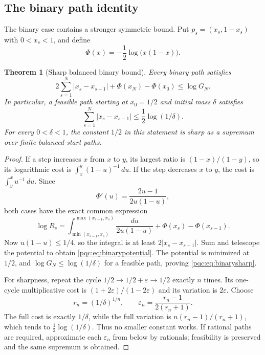 \documentclass[11pt,letterpaper]{article}
\numberwithin{equation}{section}
\newtheorem{theorem}{Theorem}[section]
\theoremstyle{definition}
\theoremstyle{remark}
\begin{document}
\subsection{The binary path identity}
The binary case contains a stronger symmetric bound. Put
$p_s=(x_s,1-x_s)$ with $0<x_s<1$, and define
\begin{equation}\label{pqc:eq:Phi}
 \Phi(x)=-\frac12\log\bigl(x(1-x)\bigr).
\end{equation}

\begin{theorem}[Sharp balanced binary bound]\label{pqc:thm:binary}
Every binary path satisfies
\begin{equation}\label{pqc:eq:binarypotential}
 2\sum_{s=1}^{N}|x_s-x_{s-1}|+
 \Phi(x_N)-\Phi(x_0)\le\log G_N.
\end{equation}
In particular, a feasible path starting at $x_0=1/2$ and initial mass
$\delta$ satisfies
\begin{equation}\label{pqc:eq:binarysharp}
 \sum_{s=1}^{N}|x_s-x_{s-1}|
 \le\frac12\log(1/\delta).
\end{equation}
For every $0<\delta<1$, the constant $1/2$ in this statement is sharp as a
supremum over finite balanced-start paths.
\end{theorem}
\begin{proof}
If a step increases $x$ from $x$ to $y$, its largest ratio is
$(1-x)/(1-y)$, so its logarithmic cost is
$\int_x^y(1-u)^{-1}\,du$. If the step decreases $x$ to $y$, the cost is
$\int_y^x u^{-1}\,du$. Since
\[
 \Phi'(u)=\frac{2u-1}{2u(1-u)},
\]
both cases have the exact common expression
\begin{equation}\label{pqc:eq:pathidentity}
 \log R_s=
 \int_{\min(x_{s-1},x_s)}^{\max(x_{s-1},x_s)}
 \frac{du}{2u(1-u)}+\Phi(x_s)-\Phi(x_{s-1}).
\end{equation}
Now $u(1-u)\le1/4$, so the integral is at least
$2|x_s-x_{s-1}|$. Sum and telescope the potential to obtain
\eqref{pqc:eq:binarypotential}. The potential is minimized at $1/2$, and
$\log G_N\le\log(1/\delta)$ for a feasible path, proving
\eqref{pqc:eq:binarysharp}.

For sharpness, repeat the cycle $1/2\to1/2+\varepsilon\to1/2$ exactly $n$
times. Its one-cycle multiplicative cost is
$(1+2\varepsilon)/(1-2\varepsilon)$ and its variation is $2\varepsilon$.
Choose
\[
 r_n=(1/\delta)^{1/n},\qquad
 \varepsilon_n=\frac{r_n-1}{2(r_n+1)}.
\]
The full cost is exactly $1/\delta$, while the full variation is
$n(r_n-1)/(r_n+1)$, which tends to
$\tfrac12\log(1/\delta)$. Thus no smaller constant works. If rational paths
are required, approximate each $\varepsilon_n$ from below by rationals;
feasibility is preserved and the same supremum is obtained.
\end{proof}
\end{document}
